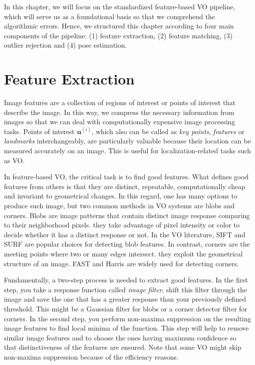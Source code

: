 \documentclass[a4paper]{report}
\numberwithin{figure}{section}
\begin{document}
In this chapter, we will focus on the standardized feature-based VO pipeline, 
which will serve us as a foundational basis so that we comprehend the 
algorithmic errors. Hence, we structured this chapter according to four main 
components of the pipeline: (1) feature extraction, (2) feature matching, (3) 
outlier rejection and (4) pose estimation. 


\section{Feature Extraction} \label{sc_feature_extraction}

Image features are a collection of regions of interest or points of interest 
that describe the image. In this way, we compress the necessary information 
from images so that we can deal with computationally expensive image 
processing tasks. Points of interest $\mathbf{u}^{(i)}$, which also can be 
called as 
\textit{key points}, \textit{features} or \textit{landmarks} interchangeably, 
are particularly valuable because their location can be measured 
accurately on an image. This is useful for localization-related tasks such as 
VO. 

In feature-based VO, the critical task is to find good features.  What defines 
good features from others is that they are distinct, repeatable, 
computationally cheap and invariant to geometrical changes. In this regard, 
one has many 
options to produce such image, but two common methods in VO systems are blobs 
and corners. Blobs are image patterns that contain distinct image response 
comparing to their neighborhood pixels. they take advantage of pixel 
intensity or color to decide whether it has a distinct response or not.  In 
the VO literature, SIFT \parencite{Lowe2004} and SURF \parencite{Bay2008} are 
popular 
choices for detecting blob features.  In contrast, corners are the meeting 
points where two or many edges intersect.  they exploit the 
geometrical structure of an image.  FAST \parencite{Rosten2006} and Harris 
\parencite{Harris1988} are widely used for detecting corners.

Fundamentally, a two-step process is needed to extract good features.  In the 
first step, 
you take a response function called \textit{image filter}, shift this filter 
through the image and save the one that has a greater response than your 
previously defined threshold.  This might be a Gaussian filter for blobs or a 
corner detector filter for corners. In the second step, you perform non-maxima 
suppression on the resulting image features to find local minima of the 
function.  This step will help to remove similar image features and to choose 
the ones having maximum confidence so that distinctiveness of the features are 
ensured.  Note that some VO might skip non-maxima suppression because of the 
efficiency 
reasons.
\end{document}
